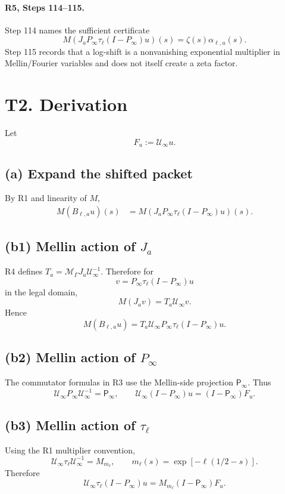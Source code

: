\documentclass[11pt]{article}
\newcommand{\Pinfty}{P_{\infty}}
\newcommand{\Pinfm}{\mathsf P_{\infty}}
\newcommand{\Mell}{M}
\newcommand{\Uinf}{\mathcal U_{\infty}}
\newcommand{\zetaF}{\zeta}
\begin{document}
\paragraph{R5, Steps 114--115.}
Step 114 names the sufficient certificate
\[
  \Mell(J_a\Pinfty\tau_\ell(I-\Pinfty)u)(s)
  =
  \zetaF(s)\alpha_{\ell,u}(s).
\]
Step 115 records that a log-shift is a nonvanishing exponential multiplier in
Mellin/Fourier variables and does not itself create a zeta factor.

\section{T2. Derivation}

Let
\[
  F_u:=\Uinf u.
\]

\subsection*{(a) Expand the shifted packet}

By R1 and linearity of \(\Mell\),
\[
\begin{aligned}
  \Mell(B_{\ell,a}u)(s)
  &=
  \Mell(J_a\Pinfty\tau_\ell(I-\Pinfty)u)(s).
\end{aligned}
\]

\subsection*{(b1) Mellin action of \(J_a\)}

R4 defines \(T_a=\mathcal M_\Gamma J_a\Uinf^{-1}\). Therefore for
\[
  v=\Pinfty\tau_\ell(I-\Pinfty)u
\]
in the legal domain,
\[
  \Mell(J_av)=T_a\Uinf v.
\]
Hence
\[
  \Mell(B_{\ell,a}u)
  =
  T_a\Uinf\Pinfty\tau_\ell(I-\Pinfty)u.
\]

\subsection*{(b2) Mellin action of \(P_\infty\)}

The commutator formulas in R3 use the Mellin-side projection \(\Pinfm\).
Thus
\[
  \Uinf\Pinfty\Uinf^{-1}=\Pinfm,
\qquad
  \Uinf(I-\Pinfty)u=(I-\Pinfm)F_u.
\]

\subsection*{(b3) Mellin action of \(\tau_\ell\)}

Using the R1 multiplier convention,
\[
  \Uinf\tau_\ell\Uinf^{-1}=M_{m_\ell},
\qquad
  m_\ell(s)=\exp[-\ell(1/2-s)].
\]
Therefore
\[
  \Uinf\tau_\ell(I-\Pinfty)u
  =
  M_{m_\ell}(I-\Pinfm)F_u.
\]
\end{document}
